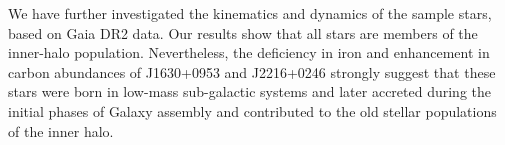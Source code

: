 We have further investigated the kinematics and dynamics of the sample stars,
based on Gaia DR2 data. Our results show that all stars are members of the
inner-halo population. Nevertheless, the deficiency in iron and enhancement in
carbon abundances of J1630+0953 and J2216+0246 strongly suggest that these stars
were born in low-mass sub-galactic systems and later accreted during the initial
phases of Galaxy assembly and contributed to the old stellar populations of the
inner halo.
